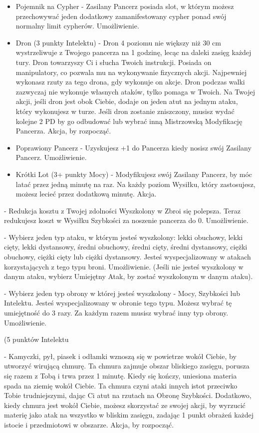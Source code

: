 {\begin{itemize}
\item Pojemnik na Cypher - Zasilany Pancerz posiada slot, w którym możesz przechowywać jeden dodatkowy zamanifestowany cypher ponad swój normalny limit cypherów. Umożliwienie.
\item Dron (3 punkty Intelektu) - Dron 4 poziomu nie większy niż 30 cm wystrzeliwuje z Twojego pancerza na 1 godzinę, lecąc na daleki zasięg każdej tury. Dron towarzyszy Ci i słucha Twoich instrukcji. Posiada on manipulatory, co pozwala mu na wykonywanie fizycznych akcji. Najpewniej wykonasz rzuty za tego drona, gdy wykonuje on akcje. Dron podczas walki zazwyczaj nie wykonuje własnych ataków, tylko pomaga w Twoich. Na Twojej akcji, jeśli dron jest obok Ciebie, dodaje on jeden atut na jednym ataku, który wykonujesz w turze. Jeśli dron zostanie zniszczony, musisz wydać kolejne 2 PD by go odbudować lub wybrać inną Mistrzowską Modyfikację Pancerza. Akcja, by rozpocząć. 
\item Poprawiony Pancerz - Uzyskujesz +1 do Pancerza kiedy nosisz swój Zasilany Pancerz. Umożliwienie.
\item Krótki Lot (3+ punkty Mocy) - Modyfikujesz swój Zasilany Pancerz, by móc latać przez jedną minutę na raz. Na każdy poziom Wysiłku, który zastosujesz, możesz lecieć przez dodatkową minutę. Akcja. 
\end{itemize}

 - Redukcja kosztu z Twojej zdolności Wyszkolony w Zbroi się polepsza. Teraz redukujesz koszt w Wysiłku Szybkości za noszenie pancerza do 0. Umożliwienie.

 - Wybierz jeden typ ataku, w którym jesteś wyszkolony: lekki obuchowy, lekki cięty, lekki dystansowy, średni obuchowy, średni cięty, średni dystansowy, ciężki obuchowy, ciężki cięty lub ciężki dystansowy. Jesteś wyspecjalizowany w atakach korzystających z tego typu broni. Umożliwienie. (Jeśli nie jesteś wyszkolony w danym ataku, wybierz Umiejętny Atak, by zostać wyszkolonym w danym ataku).

 - Wybierz jeden typ obrony w której jesteś wyszkolony - Mocy, Szybkości lub Intelektu. Jesteś wyspecjalizowany w obronie tego typu. Możesz wybrać tę umiejętność do 3 razy. Za każdym razem musisz wybrać inny typ obrony. Umożliwienie. 

 (5 punktów Intelektu} - Kamyczki, pył, piasek i odłamki wznoszą się w powietrze wokół Ciebie, by utworzyć wirującą chmurę. Ta chmura zajmuje obszar bliskiego zasięgu, porusza się razem z Tobą i trwa przez 1 minutę. Kiedy się kończy, uniesiona materia spada na ziemię wokół Ciebie. Ta chmura czyni ataki innych istot przeciwko Tobie trudniejszymi, dając Ci atut na rzutach na Obronę Szybkości. Dodatkowo, kiedy chmura jest wokół Ciebie, możesz skorzystać ze swojej akcji,  by wyrzucić materię jako atak na wszystko w bliskim zasięgu, zadając 1 punkt obrażeń każdej istocie i przedmiotowi w obszarze. Akcja, by rozpocząć. 

